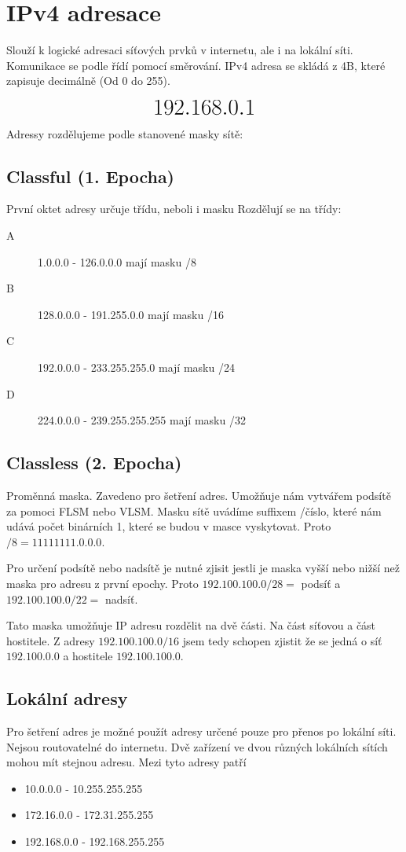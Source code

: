 \section{IPv4 adresace}
\label{sec:ipv4-adresace}
Slouží k logické adresaci síťových prvků v internetu, ale i na lokální síti.
Komunikace se podle řídí pomocí směrování.
IPv4 adresa se skládá z 4B, které zapisuje decimálně (Od 0 do 255).
\begin{center}
  \[\mathlarger{\mathlarger{\mathlarger{\mathlarger{192.168.0.1}}}}\]
\end{center}
Adressy rozdělujeme podle stanovené masky sítě:
\subsection{Classful (1. Epocha)}
První oktet adresy určuje třídu, neboli i masku
Rozdělují se na třídy:
\begin{description}
  \item[A] 1.0.0.0 - 126.0.0.0 mají masku /8
  \item[B] 128.0.0.0 - 191.255.0.0 mají masku /16
  \item[C] 192.0.0.0 - 233.255.255.0 mají masku /24
  \item[D] 224.0.0.0 - 239.255.255.255 mají masku /32 
\end{description}
\subsection{Classless (2. Epocha)}
Proměnná maska.
Zavedeno pro šetření adres.
Umožňuje nám vytvářem podsítě za pomoci FLSM nebo VLSM.
Masku sítě uvádíme suffixem /číslo, které nám udává počet binárních 1, které se budou v masce vyskytovat.
Proto $/8 = 1111 1111.0.0.0$.

Pro určení podsítě nebo nadsítě je nutné zjisit jestli je maska vyšší nebo nižší než maska pro adresu z první epochy.
Proto $192.100.100.0/28 =$ podsíť a $192.100.100.0/22 =$ nadsíť.

Tato maska umožňuje IP adresu rozdělit na dvě části.
Na část síťovou a část hostitele.
Z adresy $192.100.100.0/16$ jsem tedy schopen zjistit že se jedná o síť $192.100.0.0$ a hostitele $192.100.100.0$.
\subsection{Lokální adresy}
Pro šetření adres je možné použít adresy určené pouze pro přenos po lokální síti.
Nejsou routovatelné do internetu.
Dvě zařízení ve dvou různých lokálních sítích mohou mít stejnou adresu.
Mezi tyto adresy patří
\begin{itemize}
  \item 10.0.0.0 - 10.255.255.255
  \item 172.16.0.0 - 172.31.255.255
  \item 192.168.0.0 - 192.168.255.255
\end{itemize}
